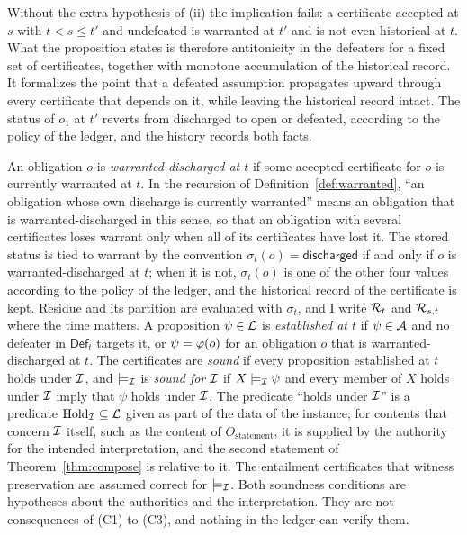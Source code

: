 Without the extra hypothesis of (ii) the implication fails: a certificate accepted at $s$ with $t<s\le t'$ and undefeated is warranted at $t'$ and is not even historical at $t$. What the proposition states is therefore antitonicity in the defeaters for a fixed set of certificates, together with monotone accumulation of the historical record. It formalizes the point that a defeated assumption propagates upward through every certificate that depends on it, while leaving the historical record intact. The status of $o_1$ at $t'$ reverts from \textsf{discharged} to \textsf{open} or \textsf{defeated}, according to the policy of the ledger, and the history records both facts.

\begin{definition}
\label{def:status}
An obligation $o$ is \emph{warranted-discharged at $t$} if some accepted certificate for $o$ is currently warranted at $t$. In the recursion of Definition~\ref{def:warranted}, ``an obligation whose own discharge is currently warranted'' means an obligation that is warranted-discharged in this sense, so that an obligation with several certificates loses warrant only when all of its certificates have lost it. The stored status is tied to warrant by the convention $\sigma_t(o)=\mathsf{discharged}$ if and only if $o$ is warranted-discharged at $t$; when it is not, $\sigma_t(o)$ is one of the other four values according to the policy of the ledger, and the historical record of the certificate is kept. Residue and its partition are evaluated with $\sigma_t$, and I write $\mathcal{R}_t$ and $\mathcal{R}_{s,t}$ where the time matters. A proposition $\psi\in\mathcal{L}$ is \emph{established at $t$} if $\psi\in\mathcal{A}$ and no defeater in $\mathsf{Def}_t$ targets it, or $\psi=\varphi(o)$ for an obligation $o$ that is warranted-discharged at $t$. The certificates are \emph{sound} if every proposition established at $t$ holds under $\mathcal{I}$, and $\models_{\mathcal{I}}$ is \emph{sound for $\mathcal{I}$} if $X\models_{\mathcal{I}}\psi$ and every member of $X$ holds under $\mathcal{I}$ imply that $\psi$ holds under $\mathcal{I}$. The predicate ``holds under $\mathcal{I}$'' is a predicate $\mathrm{Hold}_{\mathcal{I}}\subseteq\mathcal{L}$ given as part of the data of the instance; for contents that concern $\mathcal{I}$ itself, such as the content of $O_{\mathrm{statement}}$, it is supplied by the authority for the intended interpretation, and the second statement of Theorem~\ref{thm:compose} is relative to it. The entailment certificates that witness preservation are assumed correct for $\models_{\mathcal{I}}$. Both soundness conditions are hypotheses about the authorities and the interpretation. They are not consequences of (C1) to (C3), and nothing in the ledger can verify them.
\end{definition}

